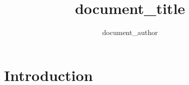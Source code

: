 \documentclass[12pt]{article}
\title{ {{document_title}} }
\author{ {{document_author}} }
\begin{document}
\maketitle
\tableofcontents

\section{Introduction}
\end{document}
